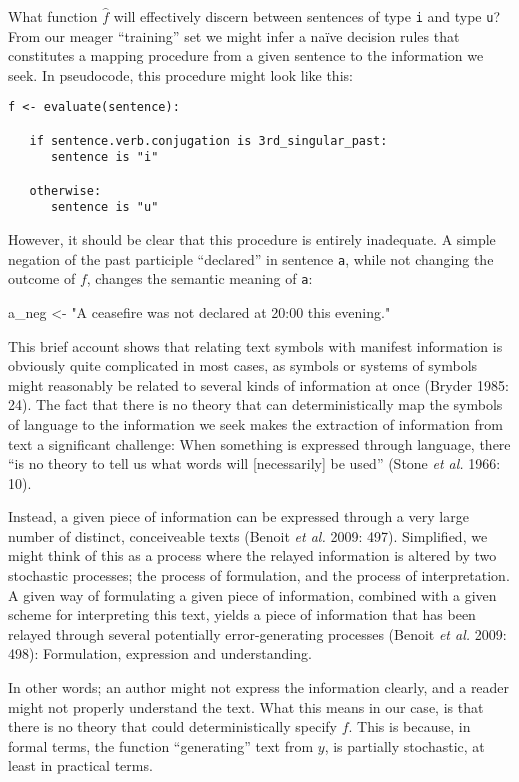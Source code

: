 \documentclass[12pt,twoside]{reedthesis}
\newenvironment{Shaded}{\begin{snugshade}}{\end{snugshade}}
\newcommand{\StringTok}[1]{\textcolor[rgb]{0.31,0.60,0.02}{#1}}
\newcommand{\NormalTok}[1]{#1}
\begin{document}
What function \(\hat{f}\) will effectively discern between sentences of
type \texttt{i} and type \texttt{u}? From our meager ``training'' set we
might infer a naïve decision rules that constitutes a mapping procedure
from a given sentence to the information we seek. In pseudocode, this
procedure might look like this:
\begin{verbatim}
f <- evaluate(sentence):

   if sentence.verb.conjugation is 3rd_singular_past:
      sentence is "i"

   otherwise:
      sentence is "u"
\end{verbatim}
However, it should be clear that this procedure is entirely inadequate.
A simple negation of the past participle ``declared'' in sentence
\texttt{a}, while not changing the outcome of \(f\), changes the
semantic meaning of \texttt{a}:
\begin{Shaded}
\begin{Highlighting}[]
\NormalTok{a_neg <-}\StringTok{ "A ceasefire was not declared at 20:00 this evening."}
\end{Highlighting}
\end{Shaded}
This brief account shows that relating text symbols with manifest
information is obviously quite complicated in most cases, as symbols or
systems of symbols might reasonably be related to several kinds of
information at once (Bryder 1985: 24). The fact that there is no theory
that can deterministically map the symbols of language to the
information we seek makes the extraction of information from text a
significant challenge: When something is expressed through language,
there ``is no theory to tell us what words will {[}necessarily{]} be
used'' (Stone \emph{et al.} 1966: 10).

Instead, a given piece of information can be expressed through a very
large number of distinct, conceiveable texts (Benoit \emph{et al.} 2009:
497). Simplified, we might think of this as a process where the relayed
information is altered by two stochastic processes; the process of
formulation, and the process of interpretation. A given way of
formulating a given piece of information, combined with a given scheme
for interpreting this text, yields a piece of information that has been
relayed through several potentially error-generating processes (Benoit
\emph{et al.} 2009: 498): Formulation, expression and understanding.

In other words; an author might not express the information clearly, and
a reader might not properly understand the text. What this means in our
case, is that there is no theory that could deterministically specify
\(f\). This is because, in formal terms, the function ``generating''
text from \(y\), is partially stochastic, at least in practical terms.
\end{document}
